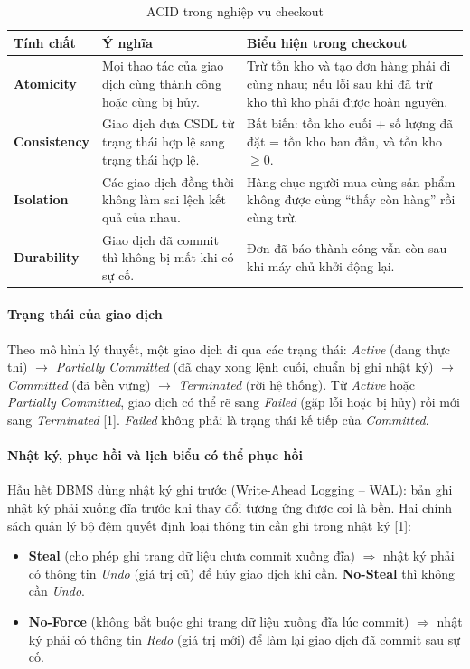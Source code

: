 \begin{table}[htbp]
\centering
\caption{ACID trong nghiệp vụ checkout}
\label{tab:tx-acid}
\renewcommand{\arraystretch}{1.25}
\begin{tabularx}{\textwidth}{>{\bfseries}l X X}
\toprule
Tính chất & \textbf{Ý nghĩa} & \textbf{Biểu hiện trong checkout} \\
\midrule
Atomicity & Mọi thao tác của giao dịch cùng thành công hoặc cùng bị hủy. & Trừ tồn kho và tạo đơn hàng phải đi cùng nhau; nếu lỗi sau khi đã trừ kho thì kho phải được hoàn nguyên. \\
Consistency & Giao dịch đưa CSDL từ trạng thái hợp lệ sang trạng thái hợp lệ. & Bất biến: tồn kho cuối + số lượng đã đặt = tồn kho ban đầu, và tồn kho $\ge 0$. \\
Isolation & Các giao dịch đồng thời không làm sai lệch kết quả của nhau. & Hàng chục người mua cùng sản phẩm không được cùng ``thấy còn hàng'' rồi cùng trừ. \\
Durability & Giao dịch đã commit thì không bị mất khi có sự cố. & Đơn đã báo thành công vẫn còn sau khi máy chủ khởi động lại. \\
\bottomrule
\end{tabularx}
\end{table}

\paragraph{Trạng thái của giao dịch}\mbox{}

Theo mô hình lý thuyết, một giao dịch đi qua các trạng thái: \textit{Active} (đang thực thi) $\rightarrow$ \textit{Partially Committed} (đã chạy xong lệnh cuối, chuẩn bị ghi nhật ký) $\rightarrow$ \textit{Committed} (đã bền vững) $\rightarrow$ \textit{Terminated} (rời hệ thống). Từ \textit{Active} hoặc \textit{Partially Committed}, giao dịch có thể rẽ sang \textit{Failed} (gặp lỗi hoặc bị hủy) rồi mới sang \textit{Terminated} [1]. \textit{Failed} không phải là trạng thái kế tiếp của \textit{Committed}.

\paragraph{Nhật ký, phục hồi và lịch biểu có thể phục hồi}\mbox{}

Hầu hết DBMS dùng nhật ký ghi trước (Write-Ahead Logging -- WAL): bản ghi nhật ký phải xuống đĩa trước khi thay đổi tương ứng được coi là bền. Hai chính sách quản lý bộ đệm quyết định loại thông tin cần ghi trong nhật ký [1]:
\begin{itemize}
    \item \textbf{Steal} (cho phép ghi trang dữ liệu chưa commit xuống đĩa) $\Rightarrow$ nhật ký phải có thông tin \textit{Undo} (giá trị cũ) để hủy giao dịch khi cần. \textbf{No-Steal} thì không cần \textit{Undo}.
    \item \textbf{No-Force} (không bắt buộc ghi trang dữ liệu xuống đĩa lúc commit) $\Rightarrow$ nhật ký phải có thông tin \textit{Redo} (giá trị mới) để làm lại giao dịch đã commit sau sự cố.
\end{itemize}

